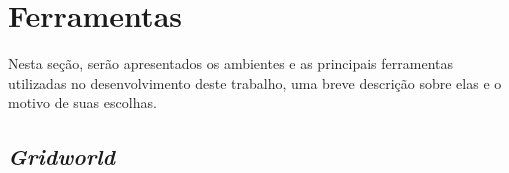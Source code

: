 




\section{Ferramentas}
\label{sec:tools}
Nesta seção, serão apresentados os ambientes e as principais ferramentas utilizadas no desenvolvimento deste trabalho, uma breve descrição sobre elas e o motivo de suas escolhas.

\subsection{\textit{Gridworld}}
\label{sec:gridworld}

